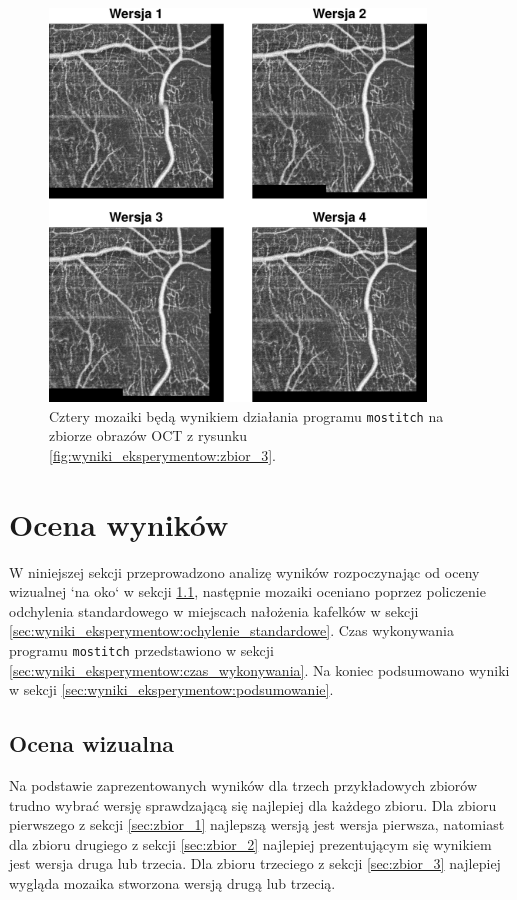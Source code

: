 \begin{figure}[htb]
  \centering
  \includegraphics[width=10cm]{gfx/wynik_zbior_3}
  \caption{Cztery mozaiki będą wynikiem działania programu \texttt{mostitch} na zbiorze obrazów OCT z rysunku \ref{fig:wyniki_eksperymentow:zbior_3}.}
  \label{fig:wyniki_eksperymentow:wynik_zbior_3}
\end{figure}

\section{Ocena wyników}
\label{sec:ocena_wynikow}

W niniejszej sekcji przeprowadzono analizę wyników rozpoczynając od oceny wizualnej `na oko` w sekcji \ref{sec:wyniki_eksperymentow:ocena_wizualna}, następnie mozaiki oceniano poprzez policzenie odchylenia standardowego w miejscach nałożenia kafelków w sekcji \ref{sec:wyniki_eksperymentow:ochylenie_standardowe}. Czas wykonywania programu \texttt{mostitch} przedstawiono w sekcji \ref{sec:wyniki_eksperymentow:czas_wykonywania}. Na koniec podsumowano wyniki w sekcji \ref{sec:wyniki_eksperymentow:podsumowanie}.

\subsection{Ocena wizualna}
\label{sec:wyniki_eksperymentow:ocena_wizualna}

Na podstawie zaprezentowanych wyników dla trzech przykładowych zbiorów trudno wybrać wersję sprawdzającą się najlepiej dla każdego zbioru. Dla zbioru pierwszego z sekcji \ref{sec:zbior_1} najlepszą wersją jest wersja pierwsza, natomiast dla zbioru drugiego z sekcji \ref{sec:zbior_2} najlepiej prezentującym się wynikiem jest wersja druga lub trzecia. Dla zbioru trzeciego z sekcji \ref{sec:zbior_3} najlepiej wygląda mozaika stworzona wersją drugą lub trzecią. 

